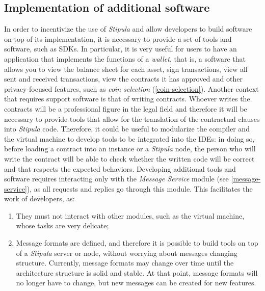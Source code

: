 \subsection{Implementation of additional software}

In order to incentivize the use of \textit{Stipula} and allow developers to build software on top of its 
implementation, it is necessary to provide a set of tools and software, such as SDKs. In particular, it is 
very useful for users to have an application that implements the functions of a \textit{wallet}, that is, a 
software that allows you to view the balance sheet for each asset, sign transactions, view all sent and 
received transactions, view the contracts it has approved and other privacy-focused features, such as 
\textit{coin selection} (\ref{coin-selection}). Another context that requires support software is that of 
writing contracts. Whoever writes the contracts will be a professional figure in the legal field and 
therefore it will be necessary to provide tools that allow for the translation of the contractual clauses 
into \textit{Stipula} code. Therefore, it could be useful to modularize the compiler and the virtual machine 
to develop tools to be integrated into the IDEs: in doing so, before loading a contract into an instance or a 
\textit{Stipula} node, the person who will write the contract will be able to check whether the written code 
will be correct and that respects the expected behaviors. Developing additional tools and software requires 
interacting only with the \textit{Message Service} module (see \ref{message-service}), as all requests and 
replies go through this module. This facilitates the work of developers, as:
\begin{enumerate}
  \item They must not interact with other modules, such as the virtual machine, whose tasks are very 
  delicate;
  \item Message formats are defined, and therefore it is possible to build tools on top of a 
  \textit{Stipula} server or node, without worrying about messages changing structure. Currently, message 
  formats may change over time until the architecture structure is solid and stable. At that point, message 
  formats will no longer have to change, but new messages can be created for new features.
\end{enumerate}
